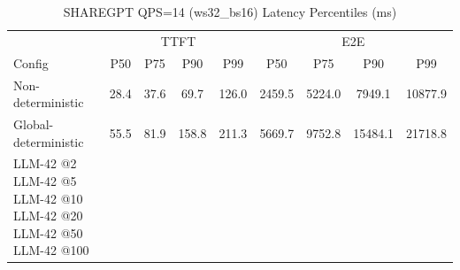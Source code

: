 \begin{table}[htbp]
\centering
\caption{SHAREGPT QPS=14 (ws32_bs16) Latency Percentiles (ms)}
\label{tab:sharegpt_qps14_ws32_bs16}
\begin{tabular}{l|cccc|cccc}
\toprule
& \multicolumn{4}{c|}{TTFT} & \multicolumn{4}{c}{E2E} \\
Config & P50 & P75 & P90 & P99 & P50 & P75 & P90 & P99 \\
\midrule
Non-deterministic & 28.4 & 37.6 & 69.7 & 126.0 & 2459.5 & 5224.0 & 7949.1 & 10877.9 \\
Global-deterministic & 55.5 & 81.9 & 158.8 & 211.3 & 5669.7 & 9752.8 & 15484.1 & 21718.8 \\
LLM-42 @2%
LLM-42 @5%
LLM-42 @10%
LLM-42 @20%
LLM-42 @50%
LLM-42 @100%
\bottomrule
\end{tabular}
\end{table}
